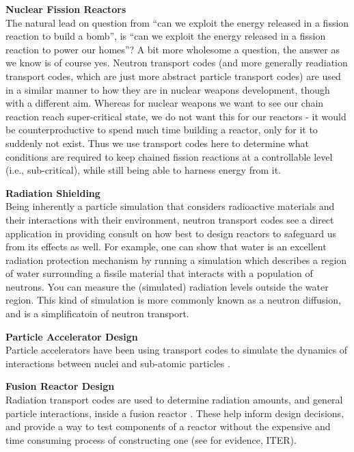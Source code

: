 \noindent\textbf{Nuclear Fission Reactors}\\
The natural lead on question from ``can we exploit the energy released in a fission reaction to build a bomb'', is ``can we exploit 
the energy released in a fission reaction to power our homes''? A bit more wholesome a question, the answer as we know is 
of course yes. Neutron transport codes (and more generally readiation transport codes, which are just more abstract 
particle transport codes) are used in a similar manner to how they are in nuclear weapons development, though with 
a different aim. Whereas for nuclear weapons we want to see our chain reaction reach super-critical state, we do not 
want this for our reactors - it would be counterproductive to spend much time building a reactor, only for it 
to suddenly not exist. Thus we use transport codes here to determine what conditions are required to keep 
chained fission reactions at a controllable level (i.e., sub-critical), while still being able to harness energy from it.

\noindent\textbf{Radiation Shielding}\\
Being inherently a particle simulation that considers radioactive materials and their interactions with their environment, 
neutron transport codes see a direct application in providing consult on how best to design reactors to safeguard 
us from its effects as well. For example, one can show that water is an excellent radiation protection mechanism by running 
a simulation which describes a region of water surrounding a fissile material that interacts with a population of neutrons. 
You can measure the (simulated) radiation levels outside the water region. This kind of simulation is more 
commonly known as a neutron diffusion, and is a simplificatoin of neutron transport.

\noindent\textbf{Particle Accelerator Design}\\
Particle accelerators have been using transport codes to simulate the dynamics of interactions between nuclei 
and sub-atomic particles \cite{particle-accelerator-neutron-codes}.

\noindent\textbf{Fusion Reactor Design}\\
Radiation transport codes are used to 
determine radiation amounts, and general particle interactions, inside a fusion reactor \cite{fusion-neutron-codes}.
These help inform design decisions, and provide a way to test components of a reactor without the expensive and time 
consuming process of constructing one (see for evidence, ITER).


